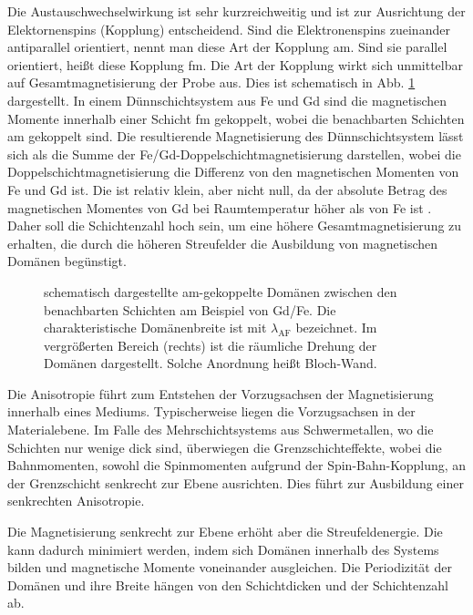 \noindent
Die Austauschwechselwirkung ist sehr kurzreichweitig und ist zur Ausrichtung der Elektornenspins (Kopplung) entscheidend. Sind die Elektronenspins zueinander antiparallel orientiert, nennt man diese Art der Kopplung \gls{am}. Sind sie parallel orientiert, heißt diese Kopplung \gls{fm}. Die Art der Kopplung wirkt sich unmittelbar auf Gesamtmagnetisierung der Probe aus. Dies ist schematisch in Abb. \ref{fig:am_fm_kopplung} dargestellt. In einem Dünnschichtsystem aus Fe und Gd sind die magnetischen Momente innerhalb einer Schicht \gls{fm} gekoppelt, wobei die benachbarten Schichten \gls{am} gekoppelt sind. Die resultierende Magnetisierung des Dünnschichtsystem lässt sich als die Summe der Fe/Gd-Doppelschichtmagnetisierung darstellen, wobei die Doppelschichtmagnetisierung die Differenz von den magnetischen Momenten von Fe und Gd ist. Die ist relativ klein, aber nicht null, da der absolute Betrag des magnetischen Momentes von Gd bei Raumtemperatur höher als von Fe ist \cite{hintermayr_structure_2021_fixed}. Daher soll die Schichtenzahl hoch sein, um eine höhere Gesamtmagnetisierung zu erhalten, die durch die höheren Streufelder die Ausbildung von magnetischen Domänen begünstigt.
\begin{figure}[H]
    \centering
    
    \caption{schematisch dargestellte \gls{am}-gekoppelte Domänen zwischen den benachbarten Schichten am Beispiel von Gd/Fe. Die charakteristische Domänenbreite ist mit $\lambda_{\text{AF}}$ bezeichnet. Im vergrößerten Bereich (rechts) ist die räumliche Drehung der Domänen dargestellt. Solche Anordnung heißt Bloch-Wand.}
    \label{fig:am_fm_kopplung}
\end{figure}
\noindent
Die Anisotropie führt zum Entstehen der Vorzugsachsen der Magnetisierung innerhalb eines Mediums. Typischerweise liegen die Vorzugsachsen in der Materialebene. Im Falle des Mehrschichtsystems aus Schwermetallen, wo die Schichten nur wenige  dick sind, überwiegen die Grenzschichteffekte, wobei die Bahnmomenten, sowohl die Spinmomenten aufgrund der Spin-Bahn-Kopplung, an der Grenzschicht senkrecht zur Ebene ausrichten. Dies führt zur Ausbildung einer senkrechten Anisotropie.

\noindent
Die Magnetisierung senkrecht zur Ebene erhöht aber die Streufeldenergie. Die kann dadurch minimiert werden, indem sich Domänen innerhalb des Systems bilden und magnetische Momente voneinander ausgleichen. Die Periodizität der Domänen und ihre Breite hängen von den Schichtdicken und der Schichtenzahl ab. 

